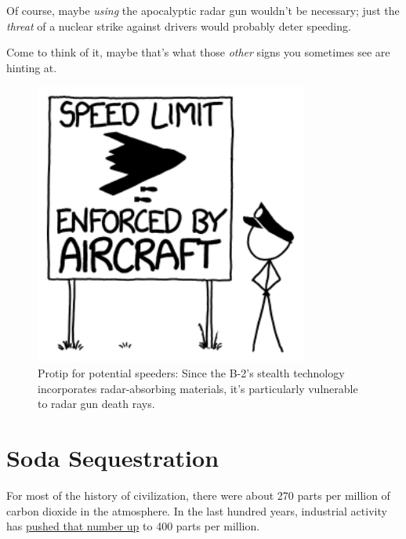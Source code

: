 {{Of course, maybe \emph{using} the apocalyptic radar gun wouldn't be necessary; just the \emph{threat} of a nuclear strike against drivers would probably deter speeding.}

{Come to think of it, maybe that's what those \emph{other} signs you sometimes see are hinting at.}

\begin{figure}[!htbp]
\centering
\includegraphics[scale=0.5, max width=0.8\textwidth]{imgs/a/87/radar_aircraft.png}
\caption{Protip for potential speeders: Since the B-2's stealth technology incorporates radar-absorbing materials, it's particularly vulnerable to radar gun death rays.}
\end{figure}

{
\chapter{Soda Sequestration}
}

\hfill{}

{For most of the history of civilization, there were about 270 parts per million of carbon dioxide in the atmosphere. In the last hundred years, industrial activity has \href{http://www.skepticalscience.com/print.php?r=45}{pushed that number up} to 400 parts per million.}

}
